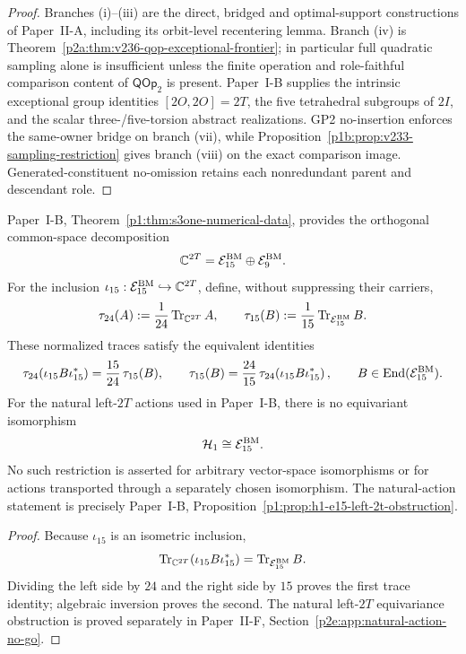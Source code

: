 \documentclass[12pt,a4paper]{article}
\begin{document}
\begin{proof}
Branches (i)--(iii) are the direct, bridged and optimal-support constructions
of Paper~II-A, including its orbit-level recentering lemma.  Branch (iv) is
Theorem~\ref{p2a:thm:v236-qop-exceptional-frontier}; in particular full
quadratic sampling alone is insufficient unless the finite operation and
role-faithful comparison content of \(\mathsf{QOp}_2\) is present.  Paper~I-B
supplies the intrinsic exceptional group identities
\([2O,2O]=2T\), the five tetrahedral subgroups of \(2I\), and the scalar
three-/five-torsion abstract realizations.  GP2 no-insertion enforces the
same-owner bridge on branch (vii), while
Proposition~\ref{p1b:prop:v233-sampling-restriction} gives branch (viii) on
the exact comparison image.  Generated-constituent no-omission retains each
nonredundant parent and descendant role.
\end{proof}

\begin{proposition}
\label{p2e:prop:bm-supported-trace-boundary}
Paper~I-B, Theorem~\ref{p1:thm:s3one-numerical-data}, provides the orthogonal
common-space decomposition~\cite{Kugelmann2026Paper1BExceptional}
\[
 \mathbb C^{2T}
 =\mathcal E_{15}^{\rm BM}\oplus\mathcal E_9^{\rm BM}.
\]
For the inclusion
\(\iota_{15}:\mathcal E_{15}^{\rm BM}\hookrightarrow\mathbb C^{2T}\),
define, without suppressing their carriers,
\[
 \tau_{24}(A):=\frac1{24}\operatorname{Tr}_{\mathbb C^{2T}}A,
 \qquad
 \tau_{15}(B):=\frac1{15}\operatorname{Tr}_{\mathcal E_{15}^{\rm BM}}B.
\]
These normalized traces satisfy the equivalent identities
\[
 \tau_{24}\!\left(\iota_{15}B\iota_{15}^*\right)
 =\frac{15}{24}\,\tau_{15}(B),
 \qquad
 \tau_{15}(B)
 =\frac{24}{15}\,
  \tau_{24}\!\left(\iota_{15}B\iota_{15}^*\right),
 \qquad
 B\in\operatorname{End}(\mathcal E_{15}^{\rm BM}).
\]
For the natural left-\(2T\) actions used in Paper~I-B, there is no equivariant
isomorphism
\[
        \mathcal H_1\cong\mathcal E_{15}^{\rm BM}.
\]
No such restriction is asserted for arbitrary vector-space isomorphisms or
for actions transported through a separately chosen isomorphism.
The natural-action statement is precisely Paper~I-B,
Proposition~\ref{p1:prop:h1-e15-left-2t-obstruction}.
\end{proposition}

\begin{proof}
Because \(\iota_{15}\) is an isometric inclusion,
\[
 \operatorname{Tr}_{\mathbb C^{2T}}(\iota_{15}B\iota_{15}^*)
 =\operatorname{Tr}_{\mathcal E_{15}^{\rm BM}}B.
\]
Dividing the left side by \(24\) and the right side by \(15\) proves the
first trace identity; algebraic inversion proves the second.  The natural
left-\(2T\) equivariance obstruction is proved separately in
Paper~II-F, Section~\ref{p2e:app:natural-action-no-go}.
\end{proof}
\end{document}
